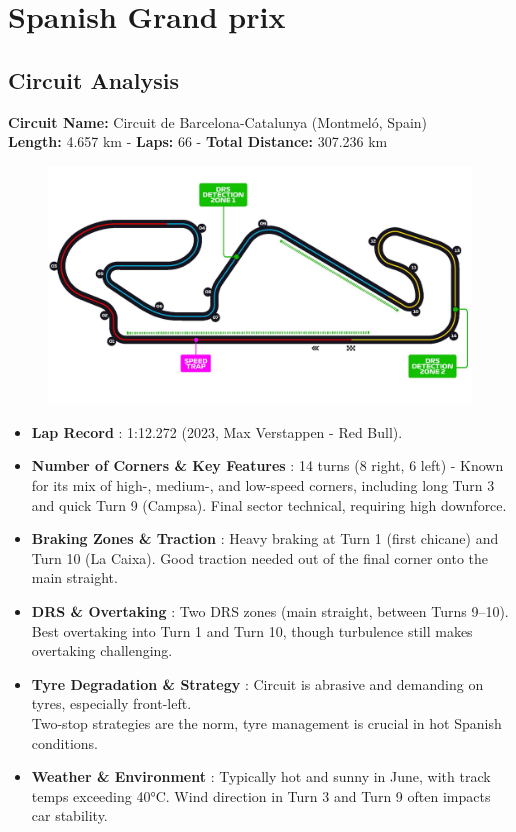 \section{Spanish Grand prix}

\subsection{Circuit Analysis}

\textbf{Circuit Name:} Circuit de Barcelona-Catalunya (Montmeló, Spain) \\
\textbf{Length:} 4.657 km - \textbf{Laps:} 66 - \textbf{Total Distance:} 307.236 km

\begin{figure}[H]
    \centering
    \includegraphics[width=0.75\linewidth]{images/10.Spain_Circuit.jpg}
\end{figure}

\begin{itemize}
    \item \textbf{Lap Record} : 1:12.272 (2023, Max Verstappen - Red Bull).
    
    \item \textbf{Number of Corners \& Key Features} : 14 turns (8 right, 6 left) - Known for its mix of high-, medium-, and low-speed corners, including long Turn 3 and quick Turn 9 (Campsa). Final sector technical, requiring high downforce.
    
    \item \textbf{Braking Zones \& Traction} : Heavy braking at Turn 1 (first chicane) and Turn 10 (La Caixa). Good traction needed out of the final corner onto the main straight.
    
    \item \textbf{DRS \& Overtaking} : Two DRS zones (main straight, between Turns 9–10).\\
    Best overtaking into Turn 1 and Turn 10, though turbulence still makes overtaking challenging.
    
    \item \textbf{Tyre Degradation \& Strategy} : Circuit is abrasive and demanding on tyres, especially front-left.\\
    Two-stop strategies are the norm, tyre management is crucial in hot Spanish conditions.
    
    \item \textbf{Weather \& Environment} : Typically hot and sunny in June, with track temps exceeding 40°C. Wind direction in Turn 3 and Turn 9 often impacts car stability.
\end{itemize}

